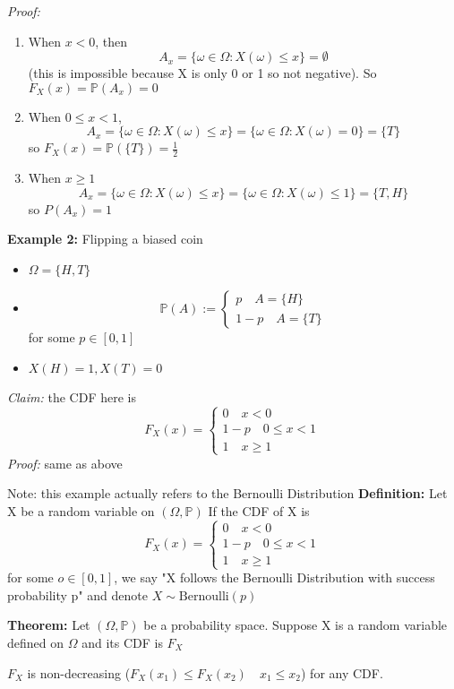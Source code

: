 \documentclass[12pt]{article}
\renewcommand{\P}{\mathbb{P}}
\begin{document}
\emph{Proof:}
\begin{enumerate}
    \item When $x < 0$, then 
    \[A_x = \{\omega \in \Omega : X(\omega) \leq x\} = \emptyset\] 
    (this is impossible because X is only 0 or 1 so not negative). So $F_X(x) = \P(A_x) = 0$
    \item When $0 \leq x < 1$, 
    \[A_x = \{\omega \in \Omega : X(\omega) \leq x\} = \{\omega \in \Omega : X(\omega) = 0\} = \{T\}\] 
    so $F_X(x) = \P(\{T\}) = \frac{1}{2}$
    \item When $x \geq 1$
    \[A_x = \{\omega \in \Omega : X(\omega) \leq x\} = \{\omega \in \Omega : X(\omega) \leq 1\} = \{T, H\}\]
    so $P(A_x) = 1$
\end{enumerate}

\textbf{Example 2:} Flipping a biased coin 
\begin{itemize}
    \item $\Omega = \{H, T\}$
    \item \[\P(A) := \begin{cases*}
        p \quad A = \{H\}\\
        1 - p \quad A = \{T\}
    \end{cases*}\]
    for some $p \in [0, 1]$
    \item $X(H) = 1, X(T) = 0$
\end{itemize}
\emph{Claim:} the CDF here is 
\[F_X(x) = \begin{cases}
    0 \quad x < 0\\
    1 - p \quad 0 \leq x < 1\\
    1 \quad x \geq 1
\end{cases}\]
\emph{Proof:} same as above 

Note: this example actually refers to the Bernoulli Distribution
\textbf{Definition:}
Let X be a random variable on $(\Omega, \P)$ If the CDF of X is 
\[F_X(x) = \begin{cases}
    0 \quad x < 0\\
    1 - p \quad 0 \leq x < 1\\
    1 \quad x \geq 1
\end{cases}\]
for some $o \in [0, 1]$, we say "X follows the Bernoulli Distribution with success probability p" and denote $X \sim \text{Bernoulli}(p)$

\textbf{Theorem:} Let $(\Omega, \P)$ be a probability space. Suppose X is a random variable defined on $\Omega$ and its CDF is $F_X$

$F_X$ is non-decreasing ($F_X(x_1) \leq F_X(x_2) \quad x_1 \leq x_2$) for any CDF.
\end{document}
